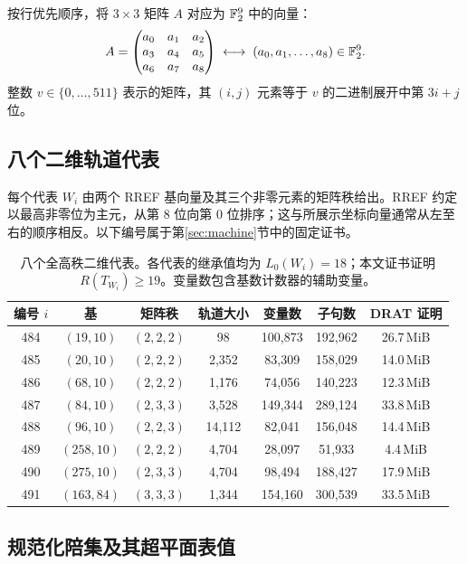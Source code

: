 \documentclass[11pt,a4paper]{article}
\begin{document}
按行优先顺序，将 $3\times3$ 矩阵 $A$ 对应为 $\mathbb{F}_2^9$ 中的向量：
\[
  A=\begin{pmatrix}a_0&a_1&a_2\\a_3&a_4&a_5\\a_6&a_7&a_8\end{pmatrix}
  \;\longleftrightarrow\;(a_0,a_1,\ldots,a_8)\in\mathbb{F}_2^9.
\]
整数 $v\in\{0,\ldots,511\}$ 表示的矩阵，其 $(i,j)$ 元素等于 $v$ 的二进制展开中第 $3i+j$ 位。

\subsection{八个二维轨道代表}

每个代表 $W_i$ 由两个 RREF 基向量及其三个非零元素的矩阵秩给出。RREF 约定以最高非零位为主元，从第 8 位向第 0 位排序；这与所展示坐标向量通常从左至右的顺序相反。以下编号属于第\ref{sec:machine}节中的固定证书。

\begin{table}[H]
\centering
\caption{八个全高秩二维代表。各代表的继承值均为 $L_0(W_i)=18$；本文证书证明 $R(T_{W_i})\ge19$。变量数包含基数计数器的辅助变量。}
\label{tab:dim2}
\begin{tabular}{ccccccc}
\toprule
编号 $i$&基&矩阵秩&轨道大小&变量数&子句数&DRAT 证明\\
\midrule
484 & $(19,10)$  & $(2,2,2)$ &    98 & 100{,}873 & 192{,}962 & 26.7\,MiB \\
485 & $(20,10)$  & $(2,2,2)$ & 2{,}352 &  83{,}309 & 158{,}029 & 14.0\,MiB \\
486 & $(68,10)$  & $(2,2,2)$ & 1{,}176 &  74{,}056 & 140{,}223 & 12.3\,MiB \\
487 & $(84,10)$  & $(2,3,3)$ & 3{,}528 & 149{,}344 & 289{,}124 & 33.8\,MiB \\
488 & $(96,10)$  & $(2,2,3)$ & 14{,}112 &  82{,}041 & 156{,}048 & 14.4\,MiB \\
489 & $(258,10)$ & $(2,2,2)$ & 4{,}704 &  28{,}097 &  51{,}933 &  4.4\,MiB \\
490 & $(275,10)$ & $(2,3,3)$ & 4{,}704 &  98{,}494 & 188{,}427 & 17.9\,MiB \\
491 & $(163,84)$ & $(3,3,3)$ & 1{,}344 & 154{,}160 & 300{,}539 & 33.5\,MiB \\
\bottomrule
\end{tabular}
\end{table}

\subsection{规范化陪集及其超平面表值}
\end{document}
